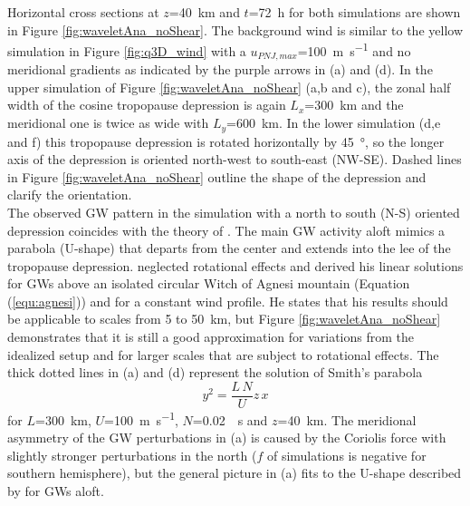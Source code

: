 Horizontal cross sections at $z$=\SI{40}{\kilo\meter} and $t$=\SI{72}{\hour} for both simulations are shown in Figure \ref{fig:waveletAna_noShear}. The background wind is similar to the yellow simulation in Figure \ref{fig:q3D_wind} with a $u_{PNJ,max}$=\SI{100}{\meter\per\second} and no meridional gradients as indicated by the purple arrows in (a) and (d). In the upper simulation of Figure \ref{fig:waveletAna_noShear} (a,b and c), the zonal half width of the cosine tropopause depression is again $L_x$=\SI{300}{\kilo\meter} and the meridional one is twice as wide with $L_y$=\SI{600}{\kilo\meter}. In the lower simulation (d,e and f) this tropopause depression is rotated horizontally by \SI{45}{\degree}, so the longer axis of the depression is oriented north-west to south-east (NW-SE). Dashed lines in Figure \ref{fig:waveletAna_noShear} outline the shape of the depression and clarify the orientation. \\
The observed GW pattern in the simulation with a north to south (N-S) oriented depression coincides with the theory of \textcite[]{smith_linear_1980}. The main GW activity aloft mimics a parabola (U-shape) that departs from the center and extends into the lee of the tropopause depression. \textcite[]{smith_linear_1980} neglected rotational effects and derived his linear solutions for GWs above an isolated circular Witch of Agnesi mountain (Equation (\ref{equ:agnesi})) and for a constant wind profile. He states that his results should be applicable to scales from 5 to \SI{50}{\kilo\meter}, but Figure \ref{fig:waveletAna_noShear} demonstrates that it is still a good approximation for variations from the idealized setup and for larger scales that are subject to rotational effects. The thick dotted lines in (a) and (d) represent the solution of Smith's parabola
\begin{equation}
    y^2 = \frac{L \, N}{U} z \, x
    \label{equ:smith_parabola}
\end{equation}
for $L$=\SI{300}{\kilo\meter}, $U$=\SI{100}{\meter\per\second}, $N$=\SI{0.02}{\per\second} and $z$=\SI{40}{\kilo\meter}. The meridional asymmetry of the GW perturbations in (a) is caused by the Coriolis force with slightly stronger perturbations in the north ($f$ of simulations is negative for southern hemisphere), but the general picture in (a) fits to the U-shape described by \textcite[]{smith_linear_1980} for GWs aloft. \\
